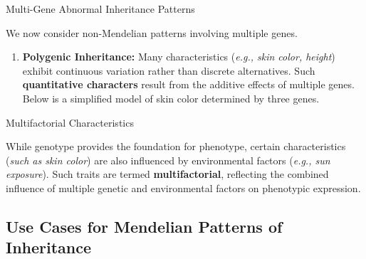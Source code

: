 \documentclass[10pt]{article}
\begin{document}
    \begin{core}{Multi-Gene Abnormal Inheritance Patterns}

      We now consider non-Mendelian patterns involving multiple genes.

      \begin{enumerate}


        \item \textbf{Polygenic Inheritance:} Many characteristics (\textit{e.g., skin color, height}) exhibit continuous variation rather than discrete alternatives. Such \textbf{quantitative characters} result from the additive effects of multiple genes. Below is a simplified model of skin color determined by three genes.


      \end{enumerate}

    \end{core}

    \begin{core}{Multifactorial Characteristics}

      While genotype provides the foundation for phenotype, certain characteristics (\textit{such as skin color}) are also influenced by environmental factors (\textit{e.g., sun exposure}). Such traits are termed \textbf{multifactorial}, reflecting the combined influence of multiple genetic and environmental factors on phenotypic expression.

    \end{core}
 
  \subsection{Use Cases for Mendelian Patterns of Inheritance}
\end{document}
